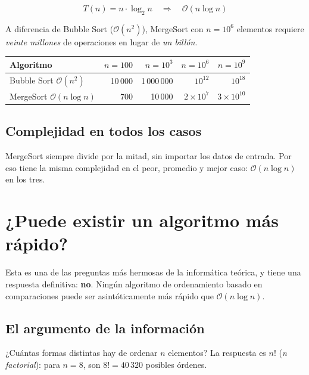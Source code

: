 \documentclass[12pt, oneside]{article}
\begin{document}
\[
  T(n) = n \cdot \log_2 n \quad \Rightarrow \quad \mathcal{O}(n \log n)
\]

A diferencia de Bubble Sort (\(\mathcal{O}(n^2)\)), MergeSort con $n=10^6$
elementos requiere \emph{veinte millones} de operaciones en lugar de
\emph{un billón}.

\begin{center}
\begin{tabular}{lrrrr}
  \toprule
  \textbf{Algoritmo} & $n=100$ & $n=10^3$ & $n=10^6$ & $n=10^9$ \\
  \midrule
  Bubble Sort \(\mathcal{O}(n^2)\)    &
    10\,000 & 1\,000\,000 & $10^{12}$ & $10^{18}$ \\
  MergeSort \(\mathcal{O}(n \log n)\) &
    700 & 10\,000 & $2\times 10^7$ & $3\times 10^{10}$ \\
  \bottomrule
\end{tabular}
\end{center}

\subsection{Complejidad en todos los casos}

MergeSort siempre divide por la mitad, sin importar los datos de entrada.
Por eso tiene la misma complejidad en el peor, promedio y mejor caso:
\(\mathcal{O}(n \log n)\) en los tres.

\section{¿Puede existir un algoritmo más rápido?}

Esta es una de las preguntas más hermosas de la informática teórica, y tiene
una respuesta definitiva: \textbf{no}. Ningún algoritmo de ordenamiento basado
en comparaciones puede ser asintóticamente más rápido que $\mathcal{O}(n \log n)$.

\subsection{El argumento de la información}

¿Cuántas formas distintas hay de ordenar $n$ elementos? La respuesta es $n!$
(\textit{n factorial}): para $n = 8$, son $8! = 40\,320$ posibles órdenes.
\end{document}
